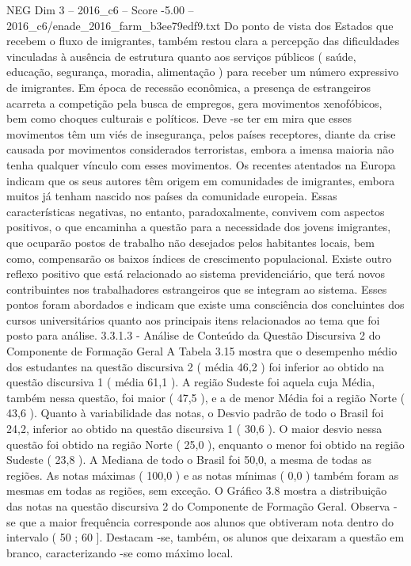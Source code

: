 \begin{textsample}{NEG Dim 3 – 2016\_c6 – Score -5.00 – 2016\_c6/enade\_2016\_farm\_b3ee79edf9.txt}
Do ponto de vista dos Estados que recebem o fluxo de imigrantes, também restou clara a percepção das dificuldades vinculadas à ausência de estrutura quanto aos serviços públicos ( saúde, educação, segurança, moradia, alimentação ) para receber um número expressivo de imigrantes.
Em época de recessão econômica, a presença de estrangeiros acarreta a competição pela busca de empregos, gera movimentos xenofóbicos, bem como choques culturais e políticos.
Deve -se ter em mira que esses movimentos têm um viés de insegurança, pelos países receptores, diante da crise causada por movimentos considerados terroristas, embora a imensa maioria não tenha qualquer vínculo com esses movimentos.
Os recentes atentados na Europa indicam que os seus autores têm origem em comunidades de imigrantes, embora muitos já tenham nascido nos países da comunidade europeia.
Essas características negativas, no entanto, paradoxalmente, convivem com aspectos positivos, o que encaminha a questão para a necessidade dos jovens imigrantes, que ocuparão postos de trabalho não desejados pelos habitantes locais, bem como, compensarão os baixos índices de crescimento populacional.
Existe outro reflexo positivo que está relacionado ao sistema previdenciário, que terá novos contribuintes nos trabalhadores estrangeiros que se integram ao sistema.
Esses pontos foram abordados e indicam que existe uma consciência dos concluintes dos cursos universitários quanto aos principais itens relacionados ao tema que foi posto para análise. 3.3.1.3 - Análise de Conteúdo da Questão Discursiva 2 do Componente de Formação Geral A Tabela 3.15 mostra que o desempenho médio dos estudantes na questão discursiva 2 ( média 46,2 ) foi inferior ao obtido na questão discursiva 1 ( média 61,1 ).
A região Sudeste foi aquela cuja Média, também nessa questão, foi maior ( 47,5 ), e a de menor Média foi a região Norte ( 43,6 ).
Quanto à variabilidade das notas, o Desvio padrão de todo o Brasil foi 24,2, inferior ao obtido na questão discursiva 1 ( 30,6 ).
O maior desvio nessa questão foi obtido na região Norte ( 25,0 ), enquanto o menor foi obtido na região Sudeste ( 23,8 ).
A Mediana de todo o Brasil foi 50,0, a mesma de todas as regiões.
As notas máximas ( 100,0 ) e as notas mínimas ( 0,0 ) também foram as mesmas em todas as regiões, sem exceção.
O Gráfico 3.8 mostra a distribuição das notas na questão discursiva 2 do Componente de Formação Geral.
Observa -se que a maior frequência corresponde aos alunos que obtiveram nota dentro do intervalo ( 50 ; 60 ].
Destacam -se, também, os alunos que deixaram a questão em branco, caracterizando -se como máximo local.

\end{textsample}

